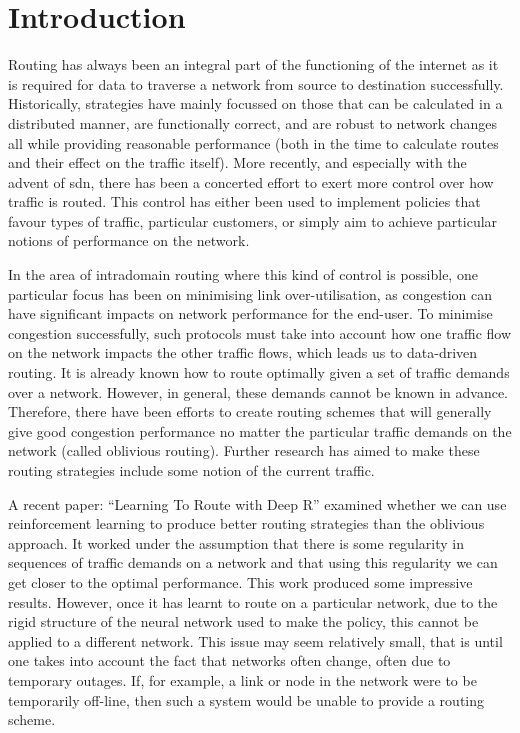 \chapter{Introduction}

\setcounter{page}{1}

Routing has always been an integral part of the functioning of the internet as it is required for data to traverse a network from source to destination successfully. Historically, strategies have mainly focussed on those that can be calculated in a distributed manner, are functionally correct, and are robust to network changes all while providing reasonable performance (both in the time to calculate routes and their effect on the traffic itself). More recently, and especially with the advent of \ac{sdn}, there has been a concerted effort to exert more control over how traffic is routed. This control has either been used to implement policies that favour types of traffic, particular customers, or simply aim to achieve particular notions of performance on the network.

In the area of intradomain routing where this kind of control is possible, one particular focus has been on minimising link over-utilisation, as congestion can have significant impacts on network performance for the end-user. To minimise congestion successfully, such protocols must take into account how one traffic flow on the network impacts the other traffic flows, which leads us to data-driven routing. It is already known how to route optimally given a set of traffic demands over a network. However, in general, these demands cannot be known in advance. Therefore, there have been efforts to create routing schemes that will generally give good congestion performance no matter the particular traffic demands on the network (called oblivious routing). Further research has aimed to make these routing strategies include some notion of the current traffic.

A recent paper: \enquote{Learning To Route with Deep R} examined whether we can use reinforcement learning to produce better routing strategies than the oblivious approach. It worked under the assumption that there is some regularity in sequences of traffic demands on a network and that using this regularity we can get closer to the optimal performance. This work produced some impressive results. However, once it has learnt to route on a particular network, due to the rigid structure of the neural network used to make the policy, this cannot be applied to a different network. This issue may seem relatively small, that is until one takes into account the fact that networks often change, often due to temporary outages. If, for example, a link or node in the network were to be temporarily off-line, then such a system would be unable to provide a routing scheme.


